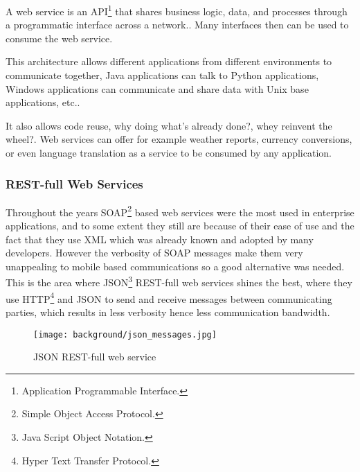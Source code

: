 A web service is an API\footnote{Application Programmable Interface.} that shares business logic, data, and processes through a programmatic interface across a network.\cite{webo}. Many interfaces then can be used to consume the web service.

This architecture allows different applications from different environments to communicate together, Java applications can talk to Python applications, Windows applications can communicate and share data with Unix base applications, etc.. 

It also allows code reuse, why doing what's already done?, whey reinvent the wheel?. Web services can offer for example weather reports, currency conversions, or even language translation as a service to be consumed by any application.

\subsubsection{REST-full Web Services}
	Throughout the years SOAP\footnote{Simple Object Access Protocol.} based web services were the most used in enterprise applications, and to some extent they still are because of their ease of use and the fact that they use XML which was already known and adopted by many developers. However the verbosity of SOAP messages make them very unappealing to mobile based communications so a good alternative was needed. This is the area where JSON\footnote{Java Script Object Notation.} REST-full web services shines the best, where they use HTTP\footnote{Hyper Text Transfer Protocol.} and JSON to send and receive messages between communicating parties, which results in less verbosity hence less communication bandwidth.
	\begin{figure}[ht]
		\centering
		\texttt{[image: background/json\_messages.jpg]}
		\caption{JSON REST-full web service}
	\end{figure}